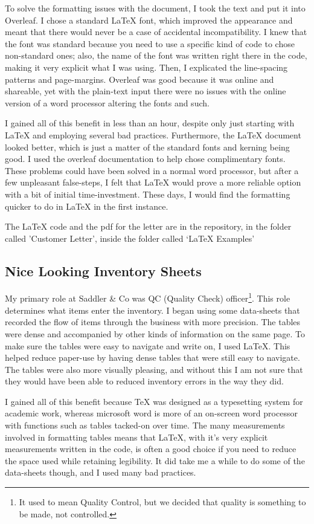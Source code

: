 \documentclass[11pt, oneside]{memoir}
\begin{document}
To solve the formatting issues with the document, I took the text and put it into Overleaf. I chose a standard \LaTeX{} font, which improved the appearance and meant that there would never be a case of accidental incompatibility. I knew that the font was standard because you need to use a specific kind of code to chose non-standard ones; also, the name of the font was written right there in the code, making it very explicit what I was using. Then, I explicated the line-spacing patterns and page-margins. Overleaf was good because it was online and shareable, yet with the plain-text input there were no issues with the online version of a word processor altering the fonts and such.

I gained all of this benefit in less than an hour, despite only just starting with \LaTeX{} and employing several bad practices. Furthermore, the \LaTeX{} document looked better, which is just a matter of the standard fonts and kerning being good. I used the overleaf documentation to help chose complimentary fonts. These problems could have been solved in a normal word processor, but after a few unpleasant false-steps, I felt that \LaTeX{} would prove a more reliable option with a bit of initial time-investment. These days, I would find the formatting quicker to do in LaTeX in the first instance.

The LaTeX code and the pdf for the letter are in the repository, in the folder called 'Customer Letter', inside the folder called `LaTeX Examples'

\subsection{Nice Looking Inventory Sheets}
My primary role at Saddler \& Co was QC (Quality Check) officer\footnote{It used to mean Quality Control, but we decided that quality is something to be made, not controlled.}. This role determines what items enter the inventory. I began using some data-sheets that recorded the flow of items through the business with more precision. The tables were dense and accompanied by other kinds of information on the same page. To make sure the tables were easy to navigate and write on, I used \LaTeX{}. This helped reduce paper-use by having dense tables that were still easy to navigate. The tables were also more visually pleasing, and without this I am not sure that they would have been able to reduced inventory errors in the way they did.

I gained all of this benefit because \TeX{} was designed as a typesetting system for academic work, whereas microsoft word is more of an on-screen word processor with functions such as tables tacked-on over time. The many measurements involved in formatting tables means that \LaTeX{}, with it's very explicit measurements written in the code, is often a good choice if you need to reduce the space used while retaining legibility. It did take me a while to do some of the data-sheets though, and I used many bad practices.
\end{document}
